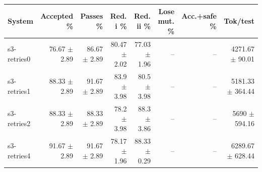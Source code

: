 \begin{tabular}{lrrrrrrr}
\toprule
System & Accepted \% & Passes \% & Red. i \% & Red. ii \% & Lose mut. \% & Acc.+safe \% & Tok/test \\
\midrule
s3-retries0 & 76.67 $\pm$ 2.89 & 86.67 $\pm$ 2.89 & 80.47 $\pm$ 2.02 & 77.03 $\pm$ 1.96 & -- & -- & 4271.67 $\pm$ 90.01 \\
s3-retries1 & 88.33 $\pm$ 2.89 & 91.67 $\pm$ 2.89 & 83.9 $\pm$ 3.98 & 80.5 $\pm$ 3.98 & -- & -- & 5181.33 $\pm$ 364.44 \\
s3-retries2 & 88.33 $\pm$ 2.89 & 88.33 $\pm$ 2.89 & 78.2 $\pm$ 3.98 & 88.3 $\pm$ 3.86 & -- & -- & 5690 $\pm$ 594.16 \\
s3-retries4 & 91.67 $\pm$ 2.89 & 91.67 $\pm$ 2.89 & 78.17 $\pm$ 1.96 & 88.33 $\pm$ 0.29 & -- & -- & 6289.67 $\pm$ 628.44 \\
\bottomrule
\end{tabular}
